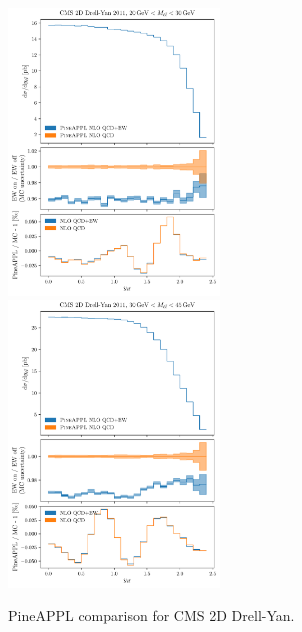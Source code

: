 \begin{figure}
    \centering
    \includegraphics[width=0.5\textwidth]{figures/pineappl_CMSDY2D11_bin1}%
    \includegraphics[width=0.5\textwidth]{figures/pineappl_CMSDY2D11_bin2}
    \caption{PineAPPL comparison for CMS 2D Drell-Yan.}
    \label{fig:cmsdy2d11_bins12}
\end{figure}

